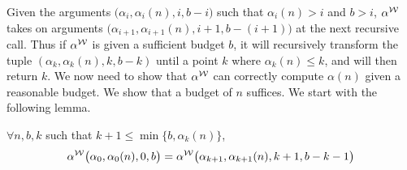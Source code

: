 Given the arguments $\big(\alpha_i, \alpha_i(n), i, b - i\big)$ such that $\alpha_i(n) > i$ and $b > i$, $\alpha^{\mathcal{W}}$ takes on arguments $\big(\alpha_{i+1}, \alpha_{i+1}(n), i+1, b - (i+1)\big)$ at the next recursive call. Thus if $\alpha^{\mathcal{W}}$ is given a sufficient budget $b$, it will recursively transform the tuple $(\alpha_k, \alpha_k(n), k, b - k)$ until a point $k$ where $\alpha_k(n)\le k$, and will then return $k$.
We now need to show that $\alpha^{\mathcal{W}}$ can correctly compute $\alpha(n)$
given a reasonable budget. We show that a budget of $n$ suffices.
We start with the following lemma.
\begin{lem} \label{lem: inv-ack-worker-intermediate}
	$\forall n, b, k$ such that $k+1\le \min\big\{b, \alpha_k(n)\big\}$, 
	\begin{equation*}
	\alpha^{\mathcal{W}}\big(\alpha_0, \alpha_0(n), 0, b\big) = \alpha^{\mathcal{W}}\big(\alpha_{k+1}, \alpha_{k+1}(n), k+1, b-k-1\big)
	\end{equation*}
\end{lem}
